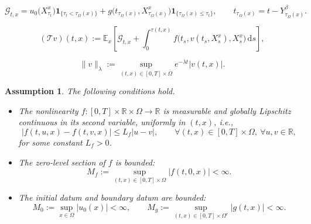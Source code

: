 \documentclass[10pt,a4paper]{amsart}
\newtheorem{assumption}{Assumption}
\newcommand{\rd}{\mathrm{d}}
\begin{document}
\begin{equation}\label{eq:terminal-payoff-prelim}
\mathcal{G}_{t,x}
=
u_0\!\bigl(X_{\tau_t}^x\bigr)\mathbf{1}_{\{\tau_t<\tau_\Omega(x)\}}
+
g\!\bigl(t_{\tau_\Omega(x)},X_{\tau_\Omega(x)}^x\bigr)
\mathbf{1}_{\{\tau_\Omega(x)\le\tau_t\}},
\qquad
t_{\tau_\Omega(x)}=t-Y_{\tau_\Omega(x)}^\beta .
\end{equation}

\begin{equation}\label{eq:T-operator-prelim}
(\mathcal{T}v)(t,x)
:=
\mathbb{E}_x\!\left[
\mathcal{G}_{t,x}
+
\int_0^{\tau(t,x)}
f\!\bigl(t_s,v(t_s,X_s^x),X_s^x\bigr)\,\rd s
\right],
\end{equation}

\begin{equation}\label{eq:weighted-norm-final}
\|v\|_\lambda
:=
\sup_{(t,x)\in[0,T]\times\overline{\Omega}}
e^{-\lambda t}|v(t,x)|.
\end{equation}

\begin{assumption}\label{ass:weighted-contraction}
The following conditions hold.
\begin{itemize}
    \item[(A1)] The nonlinearity $f:[0,T]\times\mathbb{R}\times\Omega\to\mathbb{R}$ is measurable and globally Lipschitz continuous in its second variable, uniformly in $(t,x)$, i.e.,
    \begin{equation}\label{eq:f-global-lip-final}
    |f(t,u,x)-f(t,v,x)|
    \le L_f |u-v|,
    \qquad
    \forall (t,x)\in[0,T]\times\Omega,\ \forall u,v\in\mathbb{R},
    \end{equation}
    for some constant $L_f>0$.
    
    \item[(A2)] The zero-level section of $f$ is bounded:
    \begin{equation}\label{eq:f-zero-bounded-final}
    M_f:=\sup_{(t,x)\in[0,T]\times\Omega}|f(t,0,x)|<\infty.
    \end{equation}
    
    \item[(A3)] The initial datum and boundary datum are bounded:
    \begin{equation}\label{eq:data-bounded-final}
    M_0:=\sup_{x\in\Omega}|u_0(x)|<\infty,
    \qquad
    M_g:=\sup_{(t,x)\in[0,T]\times\Omega^c}|g(t,x)|<\infty.
    \end{equation}
\end{itemize}
\end{assumption}
\end{document}
